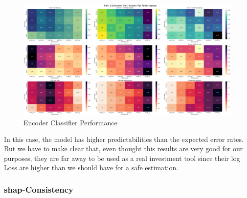 \documentclass[11pt,english,a4paper,hidelinks]{book}
\begin{document}
\begin{figure}[H]
    \centering
    \includegraphics[width=1\textwidth]{images/code/models/neural_network/classifier_nn/Big Data future - IF HARD Balanced/performance summary.png}
    \caption{Encoder Classifier Performance}    
    \label{fig:multi_class_classifier}
\end{figure}

\noindent In this case, the model has higher predictabilities than the expected error rates. But we have to make clear that, even thought this results are very good for our purposes, they are far away to be used as a real investment tool since their log Loss are higher than we should have for a safe estimation.


\subsubsection{\acrshort{shap}-Consistency}
\end{document}
